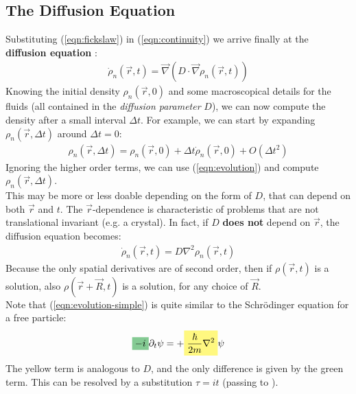 \documentclass[../template.tex]{subfiles}
\begin{document}
\subsection{The Diffusion Equation}
Substituting (\ref{eqn:fickslaw}) in (\ref{eqn:continuity}) we arrive finally at the \textbf{diffusion equation} :
\begin{align}
\dot{\rho}_n(\vec{r},t) = \vec{\nabla}(D \cdot \vec{\nabla}\rho_n(\vec{r},t))
\label{eqn:evolution}
\end{align}
Knowing the initial density $\rho_n(\vec{r},0)$ and some macroscopical details for the fluids (all contained in the \textit{diffusion parameter} $D$), we can now compute the density after a small interval $\Delta t$. For example, we can start by expanding $\rho_n(\vec{r},\Delta t)$ around $\Delta t = 0$:
\begin{align*}
\rho_n(\vec{r},\Delta t) = \rho_n(\vec{r},0) + \Delta t\dot{\rho}_n(\vec{r},0) + O(\Delta t^2)
\end{align*}
Ignoring the higher order terms, we can use (\ref{eqn:evolution}) and compute $\rho_n(\vec{r},\Delta t)$.\\

This may be more or less doable depending on the form of $D$, that can depend on both $\vec{r}$ and $t$. The $\vec{r}$-dependence is characteristic of problems that are not translational invariant (e.g. a crystal). In fact, if $D$ \textbf{does not} depend on $\vec{r}$, the diffusion equation becomes:
\begin{align}
    \dot{\rho}_n(\vec{r},t) = D \nabla^2 \rho_n(\vec{r},t)
    \label{eqn:evolution-simple}
\end{align}
Because the only spatial derivatives are of second order, then if $\rho(\vec{r},t)$ is a solution, also $\rho(\vec{r}+ \vec{R},t)$ is a solution, for any choice of $\vec{R}$.\\

Note that (\ref{eqn:evolution-simple}) is quite similar to the Schr\"odinger equation for a free particle:
\begin{align*}
\hlc{ForestGreen}{-i} \partial_t \psi = +\hlc{Yellow}{\frac{\hbar}{2m}\nabla^2} \psi
\end{align*}
The yellow term is analogous to $D$, and the only difference is given by the green term. This can be resolved by a substitution $\tau = it$ (passing to ).
\end{document}

